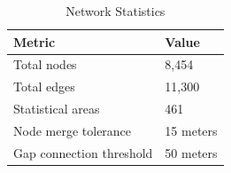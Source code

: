 \begin{table}[H]
\centering
\caption{Network Statistics}
\label{tab:network_stats}
\begin{tabular}{@{}ll@{}}
\toprule
\textbf{Metric} & \textbf{Value} \\
\midrule
Total nodes & 8,454 \\
Total edges & 11,300 \\
Statistical areas & 461 \\
Node merge tolerance & 15 meters \\
Gap connection threshold & 50 meters \\
\bottomrule
\end{tabular}
\end{table}
